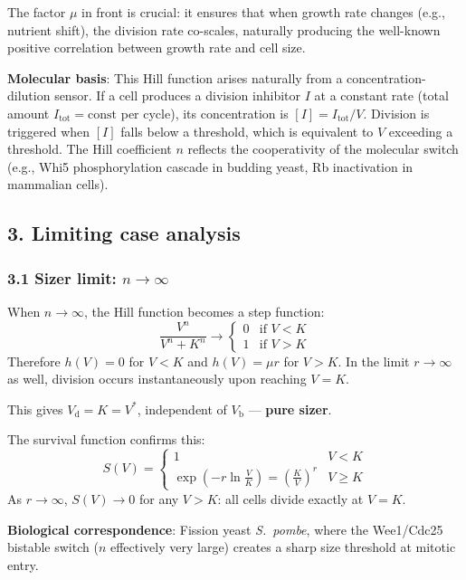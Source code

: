 \documentclass[11pt]{article}
\newcommand{\Vb}{V_{\mathrm{b}}}
\newcommand{\Vd}{V_{\mathrm{d}}}
\begin{document}
The factor $\mu$ in front is crucial: it ensures that when growth rate changes
(e.g., nutrient shift), the division rate co-scales, naturally producing the
well-known positive correlation between growth rate and cell size.

\textbf{Molecular basis}: This Hill function arises naturally from a
concentration-dilution sensor. If a cell produces a division inhibitor $I$ at a
constant rate (total amount $I_{\mathrm{tot}} = \text{const}$ per cycle), its
concentration is $[I] = I_{\mathrm{tot}} / V$. Division is triggered when
$[I]$ falls below a threshold, which is equivalent to $V$ exceeding a threshold.
The Hill coefficient $n$ reflects the cooperativity of the molecular switch
(e.g., Whi5 phosphorylation cascade in budding yeast, Rb inactivation in
mammalian cells).

\subsection*{3. Limiting case analysis}

\subsubsection*{3.1 Sizer limit: $n \to \infty$}

When $n \to \infty$, the Hill function becomes a step function:
\begin{equation}
  \frac{V^n}{V^n + K^n} \to
  \begin{cases} 0 & \text{if } V < K \\ 1 & \text{if } V > K \end{cases}
\end{equation}
Therefore $h(V) = 0$ for $V < K$ and $h(V) = \mu r$ for $V > K$.
In the limit $r \to \infty$ as well, division occurs instantaneously upon reaching $V = K$.

This gives $\Vd = K = V^*$, independent of $\Vb$ --- \textbf{pure sizer}.

The survival function confirms this:
\begin{equation}
  S(V) = \begin{cases} 1 & V < K \\
  \exp\!\left(-r \ln\frac{V}{K}\right) = \left(\frac{K}{V}\right)^r & V \geq K
  \end{cases}
\end{equation}
As $r \to \infty$, $S(V) \to 0$ for any $V > K$: all cells divide exactly at $V = K$.

\textbf{Biological correspondence}: Fission yeast \textit{S.~pombe}, where the
Wee1/Cdc25 bistable switch ($n$ effectively very large) creates a sharp size
threshold at mitotic entry.
\end{document}
